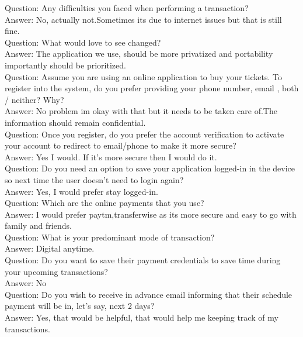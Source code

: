\documentclass[11pt, english]{report}
\begin{document}
Question: Any difficulties you faced when performing a transaction?\\
Answer: No, actually not.Sometimes its due to internet issues but that is still fine.\\

Question: What would love to see changed?\\
Answer: The application we use, should be more privatized and portability importantly should be prioritized.\\

Question: Assume you are using an online application to buy your tickets. To register into the system, do you prefer providing your phone number, email , both / neither? Why?\\
Answer: No problem im okay with that but it needs to be taken care of.The information should remain confidential.\\
 
Question: Once you register, do you prefer the account verification to activate your account to redirect to email/phone to make it more secure?\\
Answer: Yes I would. If it’s more secure then I would do it.\\
 
Question: Do you  need an option to save your application logged-in in the device so next time the user doesn’t need to login again?\\
Answer: Yes, I would prefer stay logged-in.\\

Question: Which are the online payments that you use?\\
Answer: I would prefer paytm,transferwise as its more secure and easy to go with family and friends.\\
 
Question: What is your predominant mode of transaction?\\
Answer: Digital anytime.\\
 
Question: Do you want to save their payment credentials to save time during your upcoming transactions?\\
Answer: No\\
 
Question: Do you wish to receive in advance email informing that their schedule payment will be in, let’s say, next 2 days?\\
Answer: Yes, that would be helpful, that would help me keeping track of my transactions.\\
\end{document}
